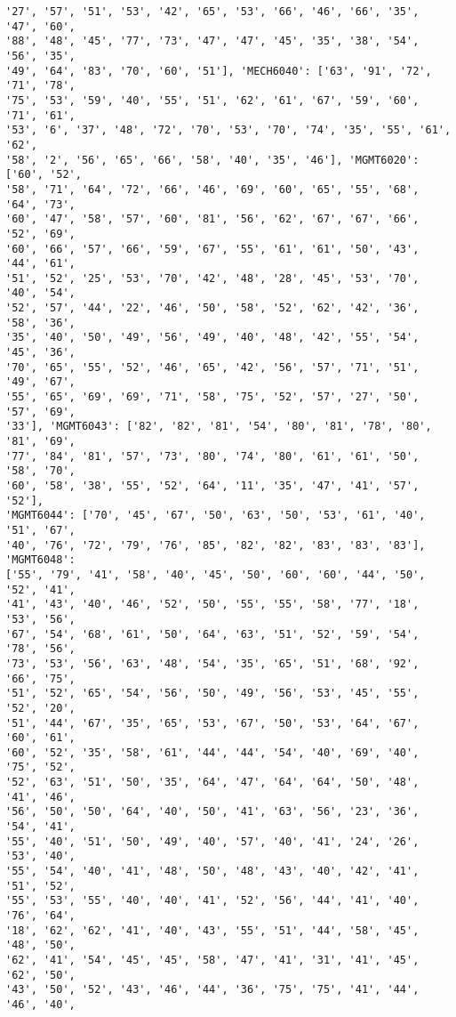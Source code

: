 \documentclass[11pt]{article}
\begin{document}
\begin{Verbatim}[commandchars=\\\{\}]
'27', '57', '51', '53', '42', '65', '53', '66', '46', '66', '35', '47', '60',
'88', '48', '45', '77', '73', '47', '47', '45', '35', '38', '54', '56', '35',
'49', '64', '83', '70', '60', '51'], 'MECH6040': ['63', '91', '72', '71', '78',
'75', '53', '59', '40', '55', '51', '62', '61', '67', '59', '60', '71', '61',
'53', '6', '37', '48', '72', '70', '53', '70', '74', '35', '55', '61', '62',
'58', '2', '56', '65', '66', '58', '40', '35', '46'], 'MGMT6020': ['60', '52',
'58', '71', '64', '72', '66', '46', '69', '60', '65', '55', '68', '64', '73',
'60', '47', '58', '57', '60', '81', '56', '62', '67', '67', '66', '52', '69',
'60', '66', '57', '66', '59', '67', '55', '61', '61', '50', '43', '44', '61',
'51', '52', '25', '53', '70', '42', '48', '28', '45', '53', '70', '40', '54',
'52', '57', '44', '22', '46', '50', '58', '52', '62', '42', '36', '58', '36',
'35', '40', '50', '49', '56', '49', '40', '48', '42', '55', '54', '45', '36',
'70', '65', '55', '52', '46', '65', '42', '56', '57', '71', '51', '49', '67',
'55', '65', '69', '69', '71', '58', '75', '52', '57', '27', '50', '57', '69',
'33'], 'MGMT6043': ['82', '82', '81', '54', '80', '81', '78', '80', '81', '69',
'77', '84', '81', '57', '73', '80', '74', '80', '61', '61', '50', '58', '70',
'60', '58', '38', '55', '52', '64', '11', '35', '47', '41', '57', '52'],
'MGMT6044': ['70', '45', '67', '50', '63', '50', '53', '61', '40', '51', '67',
'40', '76', '72', '79', '76', '85', '82', '82', '83', '83', '83'], 'MGMT6048':
['55', '79', '41', '58', '40', '45', '50', '60', '60', '44', '50', '52', '41',
'41', '43', '40', '46', '52', '50', '55', '55', '58', '77', '18', '53', '56',
'67', '54', '68', '61', '50', '64', '63', '51', '52', '59', '54', '78', '56',
'73', '53', '56', '63', '48', '54', '35', '65', '51', '68', '92', '66', '75',
'51', '52', '65', '54', '56', '50', '49', '56', '53', '45', '55', '52', '20',
'51', '44', '67', '35', '65', '53', '67', '50', '53', '64', '67', '60', '61',
'60', '52', '35', '58', '61', '44', '44', '54', '40', '69', '40', '75', '52',
'52', '63', '51', '50', '35', '64', '47', '64', '64', '50', '48', '41', '46',
'56', '50', '50', '64', '40', '50', '41', '63', '56', '23', '36', '54', '41',
'55', '40', '51', '50', '49', '40', '57', '40', '41', '24', '26', '53', '40',
'55', '54', '40', '41', '48', '50', '48', '43', '40', '42', '41', '51', '52',
'55', '53', '55', '40', '40', '41', '52', '56', '44', '41', '40', '76', '64',
'18', '62', '62', '41', '40', '43', '55', '51', '44', '58', '45', '48', '50',
'62', '41', '54', '45', '45', '58', '47', '41', '31', '41', '45', '62', '50',
'43', '50', '52', '43', '46', '44', '36', '75', '75', '41', '44', '46', '40',

\end{Verbatim}
\end{document}
